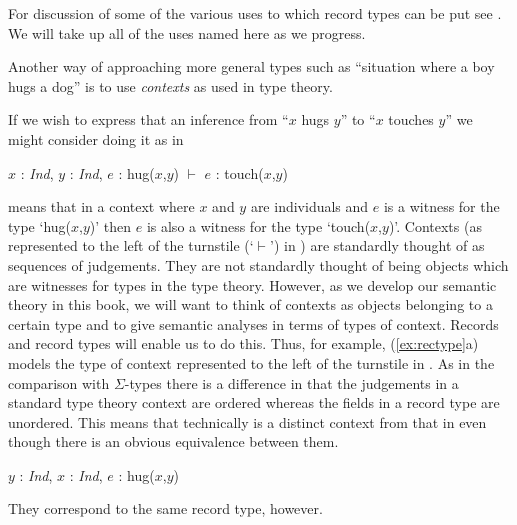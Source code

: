 For discussion of some of the various uses to which record types can
be put see \cite{Cooper2005a}.  We will take up all of the uses named
here as we progress.

Another way of approaching more general types such as ``situation
where a boy hugs a dog'' is
to use \textit{contexts} as used in type theory.    If
we wish to express that an inference from ``$x$ hugs $y$'' to ``$x$
touches $y$'' we might consider doing it as in \nexteg{}
\begin{ex} 
$x$ : \textit{Ind}, $y$ : \textit{Ind}, $e$ : hug($x$,$y$) $\vdash$
$e$ : touch($x$,$y$) 
   
\end{ex} 
\preveg{} means that in a context where $x$ and $y$ are
individuals and $e$ is a witness for the type `hug($x$,$y$)' then $e$ is
also a witness for the type `touch($x$,$y$)'.  
Contexts (as represented to the left of the turnstile (`$\vdash$') in \preveg{}) are
standardly thought of as sequences of judgements.  They are not
standardly thought of
being
objects which are witnesses for types in the type theory.  However, as
we develop our semantic theory in this book, we will want to think of
contexts as objects belonging to a certain type and to give semantic
analyses in terms of types of context.  Records and record
types will enable us to do this.  Thus, for example,
(\ref{ex:rectype}a) models the type of context represented to the left
of the turnstile in \preveg{}.
As in the comparison with $\Sigma$-types there is a difference in that
the judgements in a standard type theory context are ordered whereas
the fields in a record type are unordered.  This means that
technically \nexteg{} is a distinct context from that in \preveg{} even though
there is an obvious equivalence between them.  
\begin{ex} 
$y$ : \textit{Ind}, $x$ : \textit{Ind}, $e$ : hug($x$,$y$) 
\end{ex} 
They correspond to the
same record type, however. %


